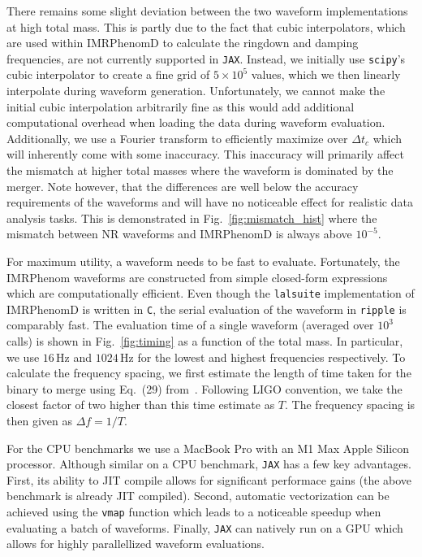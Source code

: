 \documentclass[twocolumn]{aastex631}
\newcommand{\jax}{\texttt{JAX}\xspace}
\newcommand{\ripple}{\texttt{ripple}\xspace}
\newcommand{\lalsuite}{\texttt{lalsuite}\xspace}
\begin{document}
There remains some slight deviation between the two waveform implementations at high total mass. 
This is partly due to the fact that cubic interpolators, which are used within IMRPhenomD to calculate the ringdown and damping frequencies, are not currently supported in \jax. 
Instead, we initially use \texttt{scipy}'s cubic interpolator to create a fine grid of $5\times10^5$ values, which we then linearly interpolate during waveform generation.
Unfortunately, we cannot make the initial cubic interpolation arbitrarily fine as this would add additional computational overhead when loading the data during waveform evaluation.
Additionally, we use a Fourier transform to efficiently maximize over $\Delta t_c$ which will inherently come with some inaccuracy.
This inaccuracy will primarily affect the mismatch at higher total masses where the waveform is dominated by the merger.
Note however, that the differences are well below the accuracy requirements of the waveforms and will have no noticeable effect for realistic data analysis tasks.
This is demonstrated in Fig.~\ref{fig:mismatch_hist} where the mismatch between NR waveforms and IMRPhenomD is always above $10^{-5}$.

For maximum utility, a waveform needs to be fast to evaluate.
Fortunately, the IMRPhenom waveforms are constructed from simple closed-form expressions which are computationally efficient.
Even though the \lalsuite implementation of IMRPhenomD is written in \texttt{C}, the serial evaluation of the waveform in \ripple is comparably fast. 
The evaluation time of a single waveform (averaged over $10^3$ calls) is shown in Fig.~\ref{fig:timing} as a function of the total mass. 
In particular, we use $16\,\mathrm{Hz}$ and $1024\,\mathrm{Hz}$ for the lowest and highest frequencies respectively.
To calculate the frequency spacing, we first estimate the length of time taken for the binary to merge using Eq.~(29) from~\cite{Yu:2023lml}. 
Following LIGO convention, we take the closest factor of two higher than this time estimate as $T$. 
The frequency spacing is then given as $\Delta f = 1/T$.

For the CPU benchmarks we use a MacBook Pro with an M1 Max Apple Silicon processor. 
Although similar on a CPU benchmark, \jax has a few key advantages. 
First, its ability to JIT compile allows for significant performace gains (the above benchmark is already JIT compiled).
Second, automatic vectorization can be achieved using the \texttt{vmap} function which leads to a noticeable speedup when evaluating a batch of waveforms.
Finally, \jax can natively run on a GPU which allows for highly parallellized waveform evaluations.
\end{document}
